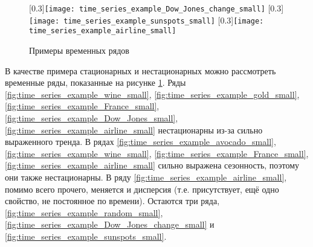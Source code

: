 \begin{figure}[h!]
    \vspace{0.5cm}
    \subcaptionbox{\label{fig:time_series_example_Dow_Jones_change_small}}[0.3\textwidth]{\texttt{[image: time\_series\_example\_Dow\_Jones\_change\_small]}}
    \hfill
    \subcaptionbox{\label{fig:time_series_example_sunspots_small}}[0.3\textwidth]{\texttt{[image: time\_series\_example\_sunspots\_small]}}
    \hfill
    \subcaptionbox{\label{fig:time_series_example_airline_small}}[0.3\textwidth]{\texttt{[image: time\_series\_example\_airline\_small]}}

    \caption{Примеры временных рядов}
    \label{fig:time_series_examples}
\end{figure}

\newpage 
В качестве примера стационарных и нестационарных можно рассмотреть временные ряды, показанные на
рисунке 
\ref{fig:time_series_examples}. Ряды 
\ref{fig:time_series_example_wine_small}, 
\ref{fig:time_series_example_gold_small}, 
\ref{fig:time_series_example_France_small}, 
\ref{fig:time_series_example_Dow_Jones_small}, 
\ref{fig:time_series_example_airline_small} 
нестационарны из-за сильно выраженного тренда. В рядах 
\ref{fig:time_series_example_avocado_small}, 
\ref{fig:time_series_example_wine_small}, 
\ref{fig:time_series_example_France_small}, 
\ref{fig:time_series_example_airline_small} 
сильно выражена сезонность, поэтому они также нестационарны. В ряду 
\ref{fig:time_series_example_airline_small}, 
помимо всего прочего, меняется и дисперсия (т.е. присутствует, ещё одно свойство, не постоянное по времени). 
Остаются три ряда, 
\ref{fig:time_series_example_random_small}, 
\ref{fig:time_series_example_Dow_Jones_change_small} и 
\ref{fig:time_series_example_sunspots_small}.


